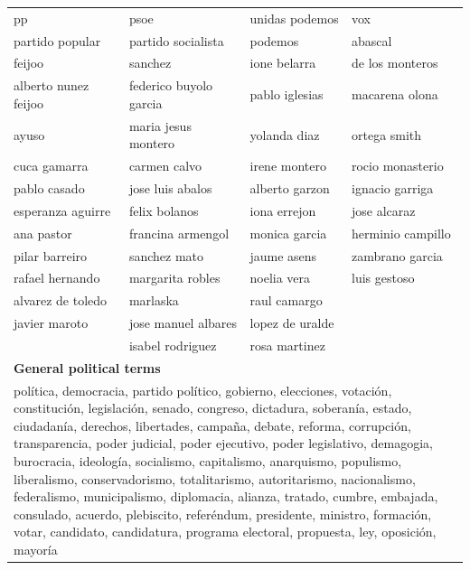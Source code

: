 \documentclass[12pt]{article}
\begin{document}
\begin{table}[!htb]
{\begin{longtable}{|l|l|l|l|}
				pp                       & psoe                       & unidas podemos     & vox               \\
				partido popular          & partido socialista         & podemos             & abascal           \\
				feijoo                   & sanchez                    & ione belarra        & de los monteros   \\
				alberto nunez feijoo     & federico buyolo garcia     & pablo iglesias      & macarena olona    \\
				ayuso                    & maria jesus montero        & yolanda diaz        & ortega smith      \\
				cuca gamarra             & carmen calvo               & irene montero       & rocio monasterio  \\
				pablo casado             & jose luis abalos           & alberto garzon      & ignacio garriga   \\
				esperanza aguirre        & felix bolanos              & iona errejon        & jose alcaraz      \\
				ana pastor               & francina armengol          & monica garcia       & herminio campillo \\
				pilar barreiro           & sanchez mato               & jaume asens         & zambrano garcia   \\
				rafael hernando          & margarita robles           & noelia vera         & luis gestoso      \\
				alvarez de toledo        & marlaska                   & raul camargo        &                   \\
				javier maroto            & jose manuel albares        & lopez de uralde     &                   \\
				& isabel rodriguez           & rosa martinez       &                   \\
				\hline
				\multicolumn{4}{|l|}{\textbf{General political terms}}\\
				\hline
				\multicolumn{4}{|p{.95\linewidth}|}{%
					política, democracia, partido político, gobierno, elecciones, votación, constitución, legislación, senado, congreso, dictadura, soberanía, estado, ciudadanía, derechos, libertades, campaña, debate, reforma, corrupción, transparencia, poder judicial, poder ejecutivo, poder legislativo, demagogia, burocracia, ideología, socialismo, capitalismo, anarquismo, populismo, liberalismo, conservadorismo, totalitarismo, autoritarismo, nacionalismo, federalismo, municipalismo, diplomacia, alianza, tratado, cumbre, embajada, consulado, acuerdo, plebiscito, referéndum, presidente, ministro, formación, votar, candidato, candidatura, programa electoral, propuesta, ley, oposición, mayoría%
}
\end{longtable}}
\end{table}
\end{document}
